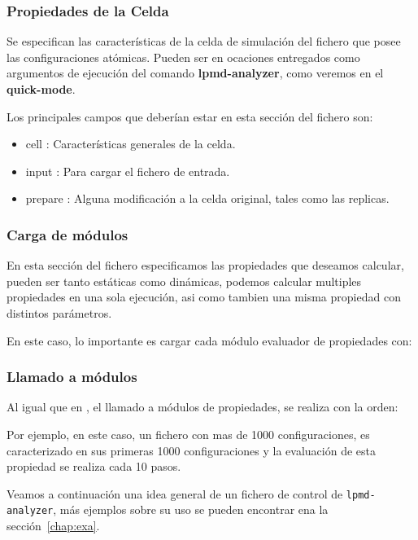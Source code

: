 \subsubsection{Propiedades de la Celda}
Se especifican las caracter\'isticas de la celda de simulaci\'on del fichero que posee las configuraciones at\'omicas. Pueden ser en ocaciones entregados como argumentos de ejecuci\'on del comando \textbf{lpmd-analyzer}, como veremos en el \textbf{quick-mode}.

Los principales campos que deber\'ian estar en esta secci\'on del fichero son:
\begin{itemize}
 \item cell : Caracter\'isticas generales de la celda.
 \item input : Para cargar el fichero de entrada.
 \item prepare : Alguna modificaci\'on a la celda original, tales como las replicas.
\end{itemize}
\subsubsection{Carga de m\'odulos}
En esta secci\'on del fichero especificamos las propiedades que deseamos calcular, pueden ser tanto est\'aticas como din\'amicas, podemos calcular multiples propiedades en una sola ejecuci\'on, asi como tambien una misma propiedad con distintos par\'ametros.

En este caso, lo importante es cargar cada m\'odulo evaluador de propiedades con:

\subsubsection{Llamado a m\'odulos}
Al igual que en {\lpmd}, el llamado a m\'odulos de propiedades, se realiza con la orden:


Por ejemplo, en este caso, un fichero con mas de 1000 configuraciones, es caracterizado en sus primeras 1000 configuraciones y la evaluaci\'on de esta propiedad se realiza cada 10 pasos.

Veamos a continuaci\'on una idea general de un fichero de control de \verb|lpmd-analyzer|, m\'as ejemplos sobre su uso se pueden encontrar ena la secci\'on~\ref{chap:exa}.

